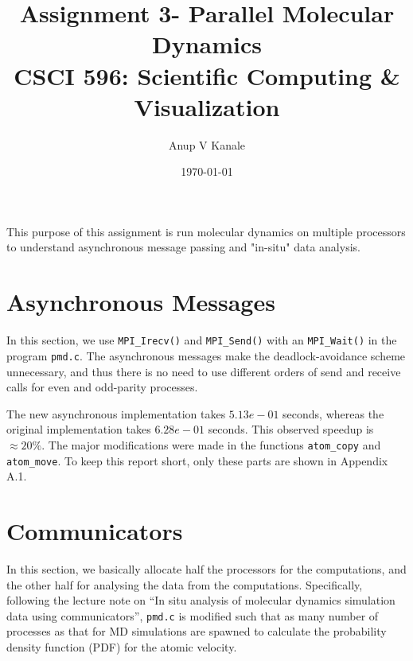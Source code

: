 \documentclass[11pt, oneside]{article}   	%
\title{\vspace{-6ex} Assignment 3- Parallel Molecular Dynamics \\ {CSCI 596: Scientific Computing \& Visualization}  \vspace{-2ex}}
\author{Anup V Kanale}
\date{\vspace{-2ex}\today}							%
\begin{document}
\maketitle \vspace{-5ex}

This purpose of this assignment is run molecular dynamics on multiple processors to understand asynchronous message passing and "in-situ" data analysis.
\vspace{-2ex} \section{Asynchronous Messages}
In this section, we use \texttt{MPI\_Irecv()} and \texttt{MPI\_Send()} with an \texttt{MPI\_Wait()} in the program \texttt{pmd.c}. The asynchronous messages make the deadlock-avoidance scheme unnecessary, and thus there is no need to use different orders of send and receive calls for even and odd-parity processes.

The new asynchronous implementation takes $5.13e-01$ seconds, whereas the original implementation takes $6.28e-01$ seconds. This observed speedup is $\approx 20\%$. The major modifications were made in the functions \texttt{atom\_copy} and \texttt{atom\_move}. To keep this report short, only these parts are shown in Appendix A.1.

\vspace{-2ex} \section{Communicators}
In this section, we basically allocate half the processors for the computations, and the other half for analysing the data from the computations. Specifically, following the lecture note on ``In situ analysis of molecular dynamics simulation data using communicators'', \texttt{pmd.c} is modified such that as many number of processes as that for MD simulations are spawned to calculate the probability density function (PDF) for the atomic velocity.
\end{document}

